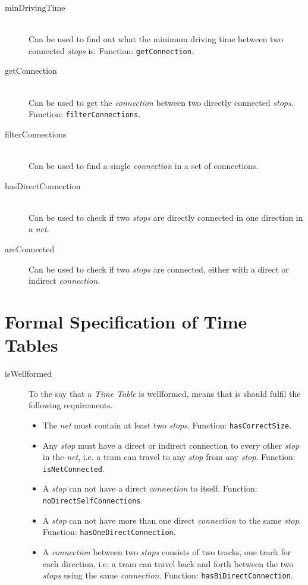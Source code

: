\documentclass[a4]{article}
\begin{document}
\begin{description}
    \item[minDrivingTime] \hfill \\ Can be used to find out what the minimum driving time between two connected \emph{stops} is. Function: \verb=getConnection=.
    \item[getConnection] \hfill \\ Can be used to get the \emph{connection} between two directly connected \emph{stops}. Function: \verb=filterConnections=.
    \item[filterConnections] \hfill \\ Can be used to find a single \emph{connection} in a set of connections.
    \item[hasDirectConnection] \hfill \\ Can be used to check if two \emph{stops} are directly connected in one direction in a \emph{net}.
    \item[areConnected] Can be used to check if two \emph{stops} are connected, either with a direct or indirect \emph{connection}.
\end{description}  

\section{Formal Specification of Time Tables}



\begin{description}
    \item[isWellformed] \hfill To the say that a \emph{Time Table} is wellformed, means that is should fulfil the following requirements.
        \begin{itemize}
            \item The \emph{net} must contain at least two \emph{stops}. Function: \verb=hasCorrectSize=.
            \item Any \emph{stop} must have a direct or indirect connection to every other \emph{stop} in the \emph{net}, i.e. a tram can travel to any \emph{stop} from any \emph{stop}. Function: \verb=isNetConnected=.
            \item A \emph{stop} can not have a direct \emph{connection} to itself. Function: \verb=noDirectSelfConnections=.
            \item A \emph{stop} can not have more than one direct \emph{connection} to the same \emph{stop}. Function: \verb=hasOneDirectConnection=.
            \item A \emph{connection} between two \emph{stops} consists of two tracks, one track for each direction, i.e. a tram can travel back and forth between the two \emph{stops} using the same \emph{connection}. Function: \verb=hasBiDirectConnection=.
        \end{itemize}
\end{description}
\end{document}
